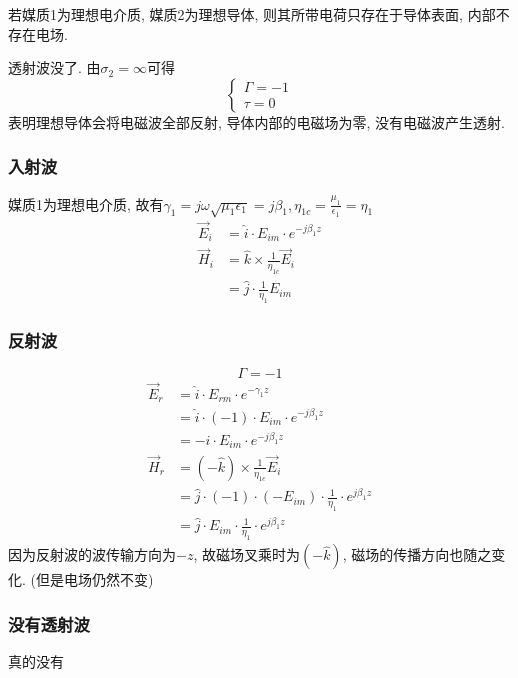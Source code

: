 \documentclass[a4paper]{report}
\begin{document}
若媒质1为理想电介质, 媒质2为理想导体, 则其所带电荷只存在于导体表面, 内部不存在电场. 
\par 透射波没了. 由$\sigma_2=\infty$可得
$$\begin{cases}
    \Gamma=-1\\
    \tau=0
\end{cases}$$
表明理想导体会将电磁波全部反射, 导体内部的电磁场为零, 没有电磁波产生透射. 
\subsubsection{入射波}
媒质1为理想电介质, 故有$\gamma_1=j\omega\sqrt{\mu_1\epsilon_1}=j\beta_1, \eta_{1c}=\frac{\mu_1}{\epsilon_1}=\eta_1$
\begin{align*}
    \vec{E}_i&=\hat{i}\cdot E_{im}\cdot e^{-j\beta_1 z}\\
    \vec{H}_i&=\hat{k}\times \frac{1}{\eta_{1c}}\vec{E}_i\\
    &=\hat{j}\cdot \frac{1}{\eta_1}E_{im}  
\end{align*}
\subsubsection{反射波}
$$\Gamma=-1$$
\begin{align*}
    \vec{E}_r&=\hat{i}\cdot E_{rm}\cdot e^{-\gamma_1 z}\\
    &= \hat{i}\cdot (-1)\cdot E_{im}\cdot e^{-j\beta_1 z}\\
    &=-\hat{i}\cdot E_{im}\cdot e^{-j\beta_1 z}\\
    \vec{H}_r&=(-\hat{k})\times \frac{1}{\eta_{1c}} \vec{E}_i \\
    &=\hat{j}\cdot (-1)\cdot (-E_{im})\cdot \frac{1}{\eta_1}\cdot e^{j\beta_1 z}\\
    &=\hat{j}\cdot E_{im}\cdot \frac{1}{\eta_1}\cdot e^{j\beta_1 z}
\end{align*}
因为反射波的波传输方向为$-z$, 故磁场叉乘时为$(-\hat{k})$, 磁场的传播方向也随之变化. (但是电场仍然不变)
\subsubsection{没有透射波}
真的没有
\end{document}

